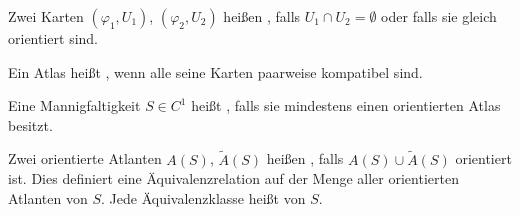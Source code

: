 \documentclass[a4paper,10pt]{scrbook}
\begin{document}
\begin{theorem} \label{thm:9.9}
  \begin{enum-arab}
    \item Zwei Karten $(\varphi_1,U_1)$, $(\varphi_2,U_2)$ heißen  , falls $U_1 \cap U_2 = \emptyset$ oder falls sie gleich orientiert sind.

    \item Ein Atlas heißt  , wenn alle seine Karten paarweise kompatibel sind.

    \item Eine Mannigfaltigkeit $S \in C^1$ heißt  , falls sie mindestens einen orientierten Atlas besitzt.

    \item Zwei orientierte Atlanten $A(S)$, $\widetilde{A}(S)$ heißen  , falls $A(S) \cup \widetilde{A}(S)$ orientiert ist. Dies definiert eine Äquivalenzrelation auf der Menge aller orientierten Atlanten von $S$. Jede Äquivalenzklasse heißt   von $S$.
  \end{enum-arab}
\end{theorem}
\end{document}

